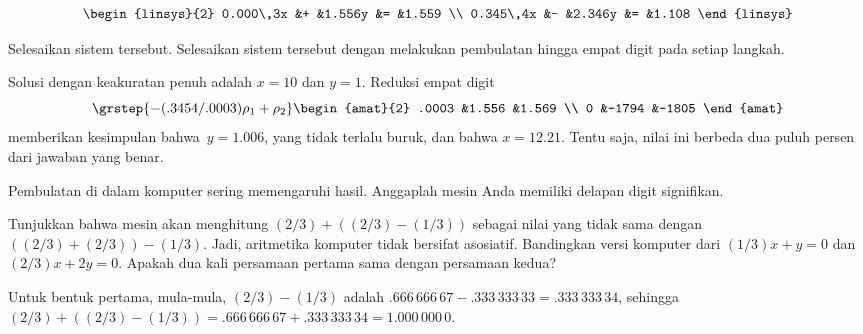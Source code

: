 \begin{exercises}
\begin{equation*}
\begin{linsys}{2}
        0.000\,3x  &+  &1.556y  &=  &1.559 \\
        0.345\,4x  &-  &2.346y  &=  &1.108
      \end{linsys}
    \end{equation*}
    \begin{exparts*}
      \partsitem Selesaikan sistem tersebut.
      \partsitem Selesaikan sistem tersebut dengan
         melakukan pembulatan hingga empat digit pada setiap langkah. 
    \end{exparts*}
    \begin{answer}
      \begin{exparts}
        \partsitem Solusi dengan keakuratan penuh adalah $x=10$ dan $y=1$.
        \partsitem Reduksi empat digit
          \begin{equation*}
            \grstep{-(.3454/.0003)\rho_1+\rho_2}
            \begin{amat}{2}
              .0003  &1.556  &1.569  \\
              0      &-1794   &-1805
            \end{amat}
          \end{equation*}
          memberikan kesimpulan bahwa~$y=1.006$, yang tidak terlalu buruk,
          dan bahwa $x=12.21$. 
          Tentu saja, nilai ini berbeda dua puluh persen dari jawaban yang benar.
      \end{exparts}
    \end{answer}
  \item 
    Pembulatan di dalam komputer sering memengaruhi hasil.
    Anggaplah mesin Anda memiliki delapan digit signifikan.
    \begin{exparts}
      \partsitem Tunjukkan bahwa mesin akan menghitung
         $(2/3)+((2/3)-(1/3))$ sebagai nilai yang tidak sama dengan
         $((2/3)+(2/3))-(1/3)$.
         Jadi, aritmetika komputer tidak bersifat asosiatif.
      \partsitem Bandingkan versi komputer dari $(1/3)x+y=0$
        dan $(2/3)x+2y=0$.
        Apakah dua kali persamaan pertama sama dengan persamaan kedua?
    \end{exparts}
    \begin{answer}
      \begin{exparts}
        \partsitem Untuk bentuk pertama, mula-mula, $(2/3)-(1/3)$ adalah
          $.666\,666\,67-.333\,333\,33=.333\,333\,34$,
          sehingga
          $(2/3)+((2/3)-(1/3))=.666\,666\,67+.333\,333\,34=1.000\,000\,0$.


\end{exparts}
\end{answer}
\end{exercises}
